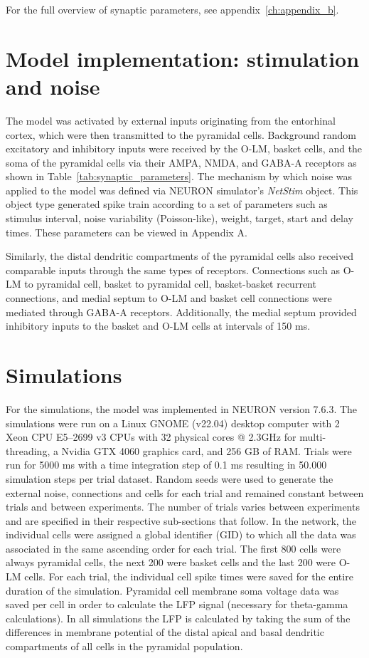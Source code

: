 \noindent For the full overview of synaptic parameters, see appendix~\ref{ch:appendix_b}.
\pagebreak

\section{Model implementation: stimulation and noise}
The model was activated by external inputs originating from the entorhinal
cortex, which were then transmitted to the pyramidal cells. Background random
excitatory and inhibitory inputs were received by the O-LM, basket cells, and
the soma of the pyramidal cells via their AMPA, NMDA, and GABA-A receptors as
shown in Table~\ref{tab:synaptic_parameters}. The mechanism by which noise was
applied to the model was defined via NEURON simulator's \textit{NetStim}
object. This object type generated spike train according to a set of parameters
such as stimulus interval, noise variability (Poisson-like), weight, target,
start and delay times. These parameters can be viewed in Appendix A.

Similarly, the distal dendritic compartments of the pyramidal cells also
received comparable inputs through the same types of receptors. Connections
such as O-LM to pyramidal cell, basket to pyramidal cell, basket-basket
recurrent connections, and medial septum to O-LM and basket cell connections
were mediated through GABA-A receptors. Additionally, the medial septum
provided inhibitory inputs to the basket and O-LM cells at intervals of 150 ms.

\section{Simulations}
For the simulations, the model was implemented in NEURON version 7.6.3. The
simulations were run on a Linux GNOME (v22.04) desktop computer with 2 Xeon CPU
E5--2699 v3 CPUs with 32 physical cores @ 2.3GHz for multi-threading, a Nvidia
GTX 4060 graphics card, and 256 GB of RAM\@. Trials were run for 5000 ms with a
time integration step of 0.1 ms resulting in 50.000 simulation steps per trial
dataset. Random seeds were used to generate the external noise, connections and
cells for each trial and remained constant between trials and between
experiments. The number of trials varies between experiments and are specified
in their respective sub-sections that follow. In the network, the individual
cells were assigned a global identifier (GID) to which all the data was
associated in the same ascending order for each trial. The first 800 cells were
always pyramidal cells, the next 200 were basket cells and the last 200 were
O-LM cells. For each trial, the individual cell spike times were saved for the
entire duration of the simulation. Pyramidal cell membrane soma voltage data
was saved per cell in order to calculate the LFP signal (necessary for
theta-gamma calculations). In all simulations the LFP is calculated by
taking the sum of the differences in membrane potential of the distal apical
and basal dendritic compartments of all cells in the pyramidal population.

